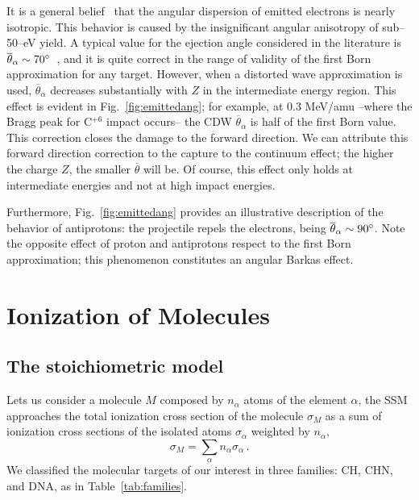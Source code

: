 \documentclass[preprint,showpacs]{revtex4}
\begin{document}
It is a general belief~\cite{Rudd1992} that the 
angular dispersion of emitted electrons is nearly isotropic. This 
behavior is caused by the insignificant angular anisotropy of 
sub--50--eV yield. 
A typical value for the ejection angle considered in the literature is 
$\overline{\theta}_{\alpha}\sim 70\degree$~\cite{surdutovic2018}, and 
it is quite correct in the range of validity of the first Born 
approximation for any target. However, when a distorted wave approximation 
is used, $\overline{\theta}_{\alpha}$ decreases substantially with $Z$ 
in the intermediate energy region. This effect is evident in 
Fig.~\ref{fig:emittedang};
for example, at 0.3 MeV/amu --where the Bragg peak for C$^{+6}$ impact 
occurs-- the CDW $\overline{\theta}_{\alpha}$ is half of the first Born 
value. This correction closes the damage to the forward direction.
We can attribute this forward direction correction to the capture to 
the continuum effect; the higher the charge $Z$, the smaller 
$\overline{\theta}$ will be. Of course, this effect only holds at 
intermediate energies and not at high impact energies. 

Furthermore, Fig.~\ref{fig:emittedang} provides an illustrative 
description of the behavior of antiprotons: the projectile repels the 
electrons, being $\overline{\theta}_{\alpha}\sim 90\degree$. Note the 
opposite effect of proton and antiprotons respect to the first Born 
approximation; this phenomenon constitutes an angular Barkas effect.


\section{Ionization of Molecules}
\label{sec:molecules}
\subsection{The stoichiometric model}
\label{subsec:stoichiometric}

Lets us consider a molecule $M$ composed by $n_{\alpha}$ atoms of the
element $\alpha$, the SSM approaches the total ionization cross section 
of the molecule $\sigma_{M}$ as a sum of ionization cross sections of 
the isolated atoms $\sigma_{\alpha}$ weighted by $n_{\alpha}$, 
\begin{equation}
 \sigma_{M}=\sum\limits_{\alpha}n_{\alpha}\sigma_{\alpha}\,.  
 \label{eq:sumion}
\end{equation}
We classified the molecular targets of our interest in three families: 
CH, CHN, and DNA, as in Table~\ref{tab:families}.
\end{document}
